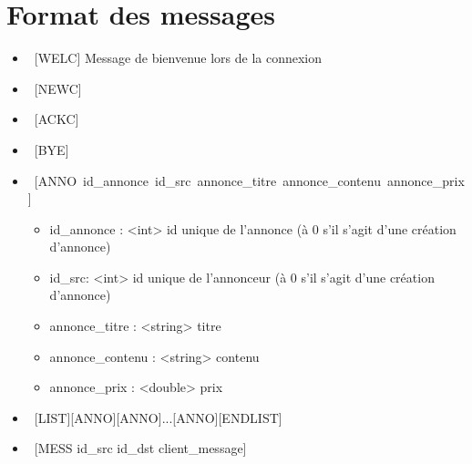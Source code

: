 \documentclass[12pt]{article}
\begin{document}
\section{Format des messages}
\begin{itemize}
  \item~[WELC] Message de bienvenue lors de la connexion
  \item~[NEWC]
  \item~[ACKC]
  \item~[BYE]
  \item~[ANNO~id\_annonce~id\_src~annonce\_titre~annonce\_contenu~annonce\_prix]
  \begin{itemize}
    \item id\_annonce : <int>  id unique de l'annonce (à 0 s'il s'agit d'une création d'annonce)
    \item id\_src: <int> id unique de l'annonceur (à 0 s'il s'agit d'une création d'annonce)
    \item annonce\_titre : <string> titre
    \item annonce\_contenu : <string> contenu
    \item annonce\_prix : <double> prix
  \end{itemize}
  \item~[LIST][ANNO][ANNO]...[ANNO][ENDLIST]
  \item~[MESS id\_src id\_dst client\_message]
  \end{itemize}
\end{document}
